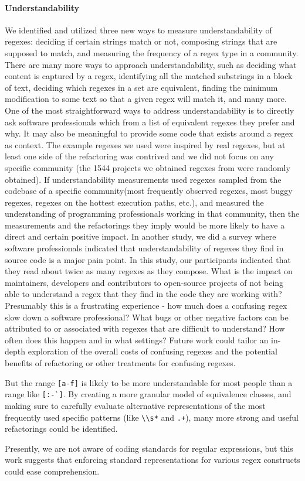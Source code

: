 \paragraph{Understandability}
We identified and utilized three new ways to measure understandability of regexes: deciding if certain strings match or not, composing strings that are supposed to match, and measuring the frequency of a regex type in a community.  There are many more ways to approach understandability, such as deciding what content is captured by a regex, identifying all the matched substrings in a block of text, deciding which regexes in a set are equivalent, finding the minimum modification to some text so that a given regex will match it, and many more.  One of the most straightforward ways to address understandability is to directly ask software professionals which from a list of equivalent regexes they prefer and why.  It may also be meaningful to provide some code that exists around a regex as context.  The example regexes we used were inspired by real regexes, but at least one side of the refactoring was contrived and we did not focus on any specific community (the 1544 projects we obtained regexes from were randomly obtained).  If understandability measurements used regexes sampled from the codebase of a specific community(most frequently observed regexes, most buggy regexes, regexes on the hottest execution paths, etc.), and measured the understanding of programming professionals working in that community, then the measurements and the refactorings they imply would be more likely to have a direct and certain positive impact.
In another study, we did a survey where software professionals indicated that understandability of regexes they find in source code is a major pain point.  In this study, our participants indicated that they read about twice as many regexes as they compose.  What is the impact on maintainers, developers and contributors to open-source projects of not being able to understand a regex that they find in the code they are working with?  Presumably this is a frustrating experience - how much does a confusing regex slow down a software professional?  What bugs or other negative factors can be attributed to or associated with regexes that are difficult to understand?  How often does this happen and in what settings?  Future work could tailor an in-depth exploration of the overall costs of confusing regexes and the potential benefits of refactoring or other treatments for confusing regexes.


But the range \verb![a-f]! is likely to be more understandable for most people than a range like \verb![:-`]!. By creating a more granular model of equivalence classes, and making sure to carefully evaluate alternative representations of the most frequently used specific patterns (like \verb!\\s*! and \verb!.+!), many more strong and useful refactorings could be identified.

Presently, we are not aware of coding standards for regular expressions, but this work suggests that enforcing standard representations for various regex constructs could ease comprehension.
